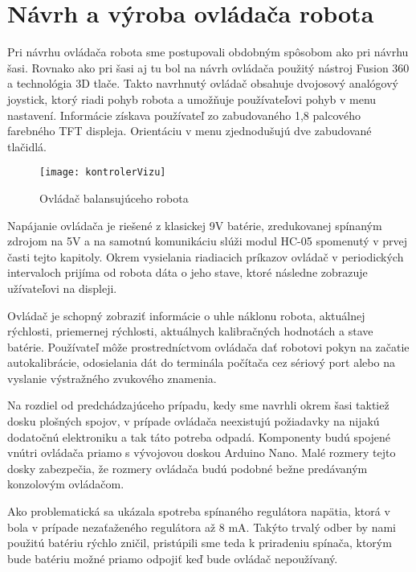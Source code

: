 \section{Návrh a výroba ovládača robota}

Pri návrhu ovládača robota sme postupovali obdobným spôsobom ako pri návrhu šasi. Rovnako ako pri šasi aj tu bol na návrh ovládača použitý nástroj Fusion 360 a technológia 3D tlače. Takto navrhnutý ovládač obsahuje dvojosový analógový joystick, ktorý riadi pohyb robota a umožňuje používateľovi pohyb v menu nastavení. Informácie získava používateľ zo zabudovaného 1,8 palcového farebného TFT displeja. Orientáciu v menu zjednodušujú dve zabudované tlačidlá.

\begin{figure}[h]
\centering
\texttt{[image: kontrolerVizu]}
\caption{Ovládač balansujúceho robota}
\label{fig:kontrolerVizu}
\end{figure}

Napájanie ovládača je riešené z klasickej 9V batérie, zredukovanej spínaným zdrojom na 5V a na samotnú komunikáciu slúži modul HC-05 spomenutý v prvej časti tejto kapitoly. Okrem vysielania riadiacich príkazov ovládač v periodických intervaloch prijíma od robota dáta o jeho stave, ktoré následne zobrazuje užívateľovi na displeji.
 
Ovládač je schopný zobraziť informácie o uhle náklonu robota, aktuálnej rýchlosti, priemernej rýchlosti, aktuálnych kalibračných hodnotách a stave batérie. Používateľ môže prostredníctvom ovládača dať robotovi pokyn na začatie autokalibrácie, odosielania dát do terminála počítača cez sériový port alebo na vyslanie výstražného zvukového znamenia.

Na rozdiel od predchádzajúceho prípadu, kedy sme navrhli okrem šasi taktiež dosku plošných spojov, v prípade ovládača neexistujú požiadavky na nijakú dodatočnú elektroniku a tak táto potreba odpadá. Komponenty budú spojené vnútri ovládača priamo s vývojovou doskou Arduino Nano. Malé rozmery tejto dosky zabezpečia, že rozmery ovládača budú podobné bežne predávaným konzolovým ovládačom. 

Ako problematická sa ukázala spotreba spínaného regulátora napätia, ktorá v bola v prípade nezaťaženého regulátora až 8 mA. Takýto trvalý odber by nami použitú batériu rýchlo zničil, pristúpili sme teda k priradeniu spínača, ktorým bude batériu možné priamo odpojiť keď bude ovládač nepoužívaný.

